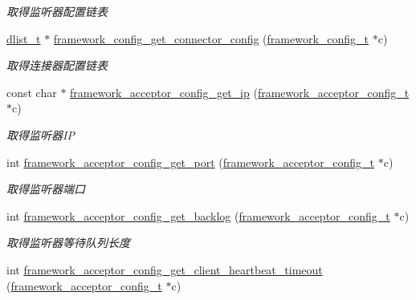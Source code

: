 \begin{DoxyCompactItemize}
\begin{DoxyCompactList}\small\item\em 取得监听器配置链表 \end{DoxyCompactList}\item 
\hyperlink{a00051_ad6644d67df4b4e3596c1eb12977d1d16_ad6644d67df4b4e3596c1eb12977d1d16}{dlist\+\_\+t} $\ast$ \hyperlink{a00055_ad6f3bd205eb112864ad9a26755e274af_ad6f3bd205eb112864ad9a26755e274af}{framework\+\_\+config\+\_\+get\+\_\+connector\+\_\+config} (\hyperlink{a00051_a55b26efa9e6ee05514d087ba2593a54b_a55b26efa9e6ee05514d087ba2593a54b}{framework\+\_\+config\+\_\+t} $\ast$c)
\begin{DoxyCompactList}\small\item\em 取得连接器配置链表 \end{DoxyCompactList}\item 
const char $\ast$ \hyperlink{a00055_a699a67643020ce0635b263ca82ba99bc_a699a67643020ce0635b263ca82ba99bc}{framework\+\_\+acceptor\+\_\+config\+\_\+get\+\_\+ip} (\hyperlink{a00051_a61a4e424ff4c86631423dedd97c40064_a61a4e424ff4c86631423dedd97c40064}{framework\+\_\+acceptor\+\_\+config\+\_\+t} $\ast$c)
\begin{DoxyCompactList}\small\item\em 取得监听器\+I\+P \end{DoxyCompactList}\item 
int \hyperlink{a00055_a438a9582850ffc05337892630cfdb3c7_a438a9582850ffc05337892630cfdb3c7}{framework\+\_\+acceptor\+\_\+config\+\_\+get\+\_\+port} (\hyperlink{a00051_a61a4e424ff4c86631423dedd97c40064_a61a4e424ff4c86631423dedd97c40064}{framework\+\_\+acceptor\+\_\+config\+\_\+t} $\ast$c)
\begin{DoxyCompactList}\small\item\em 取得监听器端口 \end{DoxyCompactList}\item 
int \hyperlink{a00055_a448d720795e0814e071d8d2212bd8af7_a448d720795e0814e071d8d2212bd8af7}{framework\+\_\+acceptor\+\_\+config\+\_\+get\+\_\+backlog} (\hyperlink{a00051_a61a4e424ff4c86631423dedd97c40064_a61a4e424ff4c86631423dedd97c40064}{framework\+\_\+acceptor\+\_\+config\+\_\+t} $\ast$c)
\begin{DoxyCompactList}\small\item\em 取得监听器等待队列长度 \end{DoxyCompactList}\item 
int \hyperlink{a00055_a69627295fbc0455a27fc5f072fbec3f6_a69627295fbc0455a27fc5f072fbec3f6}{framework\+\_\+acceptor\+\_\+config\+\_\+get\+\_\+client\+\_\+heartbeat\+\_\+timeout} (\hyperlink{a00051_a61a4e424ff4c86631423dedd97c40064_a61a4e424ff4c86631423dedd97c40064}{framework\+\_\+acceptor\+\_\+config\+\_\+t} $\ast$c)

\end{DoxyCompactItemize}
